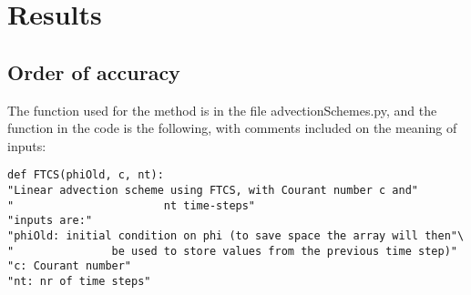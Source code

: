 

\section{Results}


\subsection{Order of accuracy}
The function used for the method is in the file advectionSchemes.py, and the function in the code is the following, with comments included on the meaning of inputs:
\begin{lstlisting}
def FTCS(phiOld, c, nt):    
"Linear advection scheme using FTCS, with Courant number c and"
"                       nt time-steps"
"inputs are:"
"phiOld: initial condition on phi (to save space the array will then"\
"               be used to store values from the previous time step)"
"c: Courant number"
"nt: nr of time steps"
\end{lstlisting}
